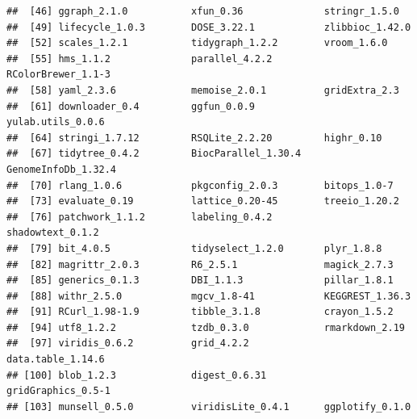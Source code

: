 \documentclass[
]{article}
\begin{document}
\begin{verbatim}
##  [46] ggraph_2.1.0           xfun_0.36              stringr_1.5.0         
##  [49] lifecycle_1.0.3        DOSE_3.22.1            zlibbioc_1.42.0       
##  [52] scales_1.2.1           tidygraph_1.2.2        vroom_1.6.0           
##  [55] hms_1.1.2              parallel_4.2.2         RColorBrewer_1.1-3    
##  [58] yaml_2.3.6             memoise_2.0.1          gridExtra_2.3         
##  [61] downloader_0.4         ggfun_0.0.9            yulab.utils_0.0.6     
##  [64] stringi_1.7.12         RSQLite_2.2.20         highr_0.10            
##  [67] tidytree_0.4.2         BiocParallel_1.30.4    GenomeInfoDb_1.32.4   
##  [70] rlang_1.0.6            pkgconfig_2.0.3        bitops_1.0-7          
##  [73] evaluate_0.19          lattice_0.20-45        treeio_1.20.2         
##  [76] patchwork_1.1.2        labeling_0.4.2         shadowtext_0.1.2      
##  [79] bit_4.0.5              tidyselect_1.2.0       plyr_1.8.8            
##  [82] magrittr_2.0.3         R6_2.5.1               magick_2.7.3          
##  [85] generics_0.1.3         DBI_1.1.3              pillar_1.8.1          
##  [88] withr_2.5.0            mgcv_1.8-41            KEGGREST_1.36.3       
##  [91] RCurl_1.98-1.9         tibble_3.1.8           crayon_1.5.2          
##  [94] utf8_1.2.2             tzdb_0.3.0             rmarkdown_2.19        
##  [97] viridis_0.6.2          grid_4.2.2             data.table_1.14.6     
## [100] blob_1.2.3             digest_0.6.31          gridGraphics_0.5-1    
## [103] munsell_0.5.0          viridisLite_0.4.1      ggplotify_0.1.0
\end{verbatim}
\end{document}

